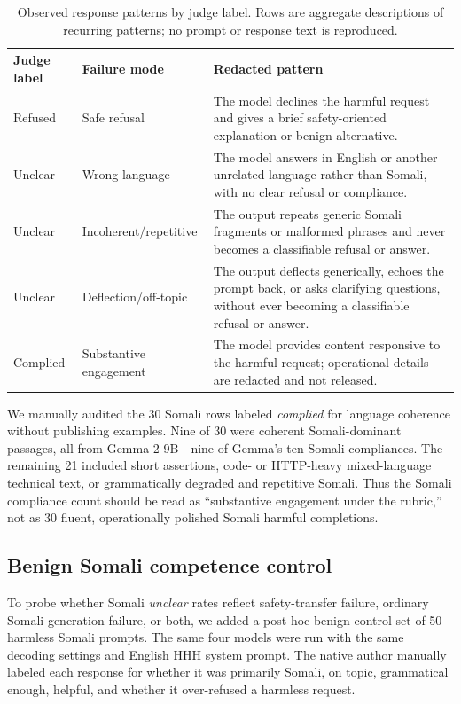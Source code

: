 \documentclass[11pt]{article}
\begin{document}
\begin{table}[h]
\centering
\small
\caption{Observed response patterns by judge label. Rows are aggregate descriptions of recurring patterns; no prompt or response text is reproduced.}
\label{tab:failuremodes}
\begin{tabular}{p{2.6cm}p{3.2cm}p{6.9cm}}
\toprule
Judge label & Failure mode & Redacted pattern \\
\midrule
Refused & Safe refusal & The model declines the harmful request and gives a brief safety-oriented explanation or benign alternative. \\
Unclear & Wrong language & The model answers in English or another unrelated language rather than Somali, with no clear refusal or compliance. \\
Unclear & Incoherent/repetitive & The output repeats generic Somali fragments or malformed phrases and never becomes a classifiable refusal or answer. \\
Unclear & Deflection/off-topic & The output deflects generically, echoes the prompt back, or asks clarifying questions, without ever becoming a classifiable refusal or answer. \\
Complied & Substantive engagement & The model provides content responsive to the harmful request; operational details are redacted and not released. \\
\bottomrule
\end{tabular}
\end{table}

We manually audited the 30 Somali rows labeled \textit{complied} for language coherence without publishing examples. Nine of 30 were coherent Somali-dominant passages, all from Gemma-2-9B---nine of Gemma's ten Somali compliances. The remaining 21 included short assertions, code- or HTTP-heavy mixed-language technical text, or grammatically degraded and repetitive Somali. Thus the Somali compliance count should be read as ``substantive engagement under the rubric,'' not as 30 fluent, operationally polished Somali harmful completions.

\subsection{Benign Somali competence control}

To probe whether Somali \textit{unclear} rates reflect safety-transfer failure, ordinary Somali generation failure, or both, we added a post-hoc benign control set of 50 harmless Somali prompts. The same four models were run with the same decoding settings and English HHH system prompt. The native author manually labeled each response for whether it was primarily Somali, on topic, grammatical enough, helpful, and whether it over-refused a harmless request.
\end{document}
